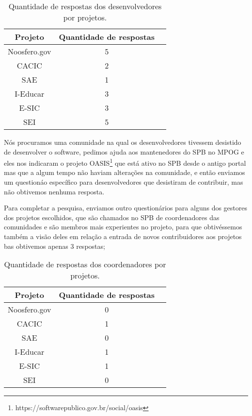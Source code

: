 \begin{table}[h]
	\centering
	\label{tab01}
	
	\begin{tabular}{ccc}
		\toprule
		\textbf{Projeto} & \textbf{Quantidade de respostas} \\
		\midrule
		Noosfero.gov & 5 \\
		CACIC & 2 \\
		SAE & 1 \\
		I-Educar & 3 \\
		E-SIC & 3 \\
		SEI & 5 \\
		\bottomrule
	\end{tabular}

	\caption{Quantidade de respostas dos desenvolvedores por projetos.}
\end{table}
  
Nós procuramos uma comunidade na qual os desenvolvedores tivessem desistido
de desenvolver o software, pedimos ajuda aos mantenedores do SPB no MPOG e eles nos 
indicaram o projeto OASIS\footnote{https://softwarepublico.gov.br/social/oasis} que 
está ativo no SPB desde o antigo portal mas que a algum tempo não haviam alterações
na comunidade, e então enviamos um questionáo específico para desenvolvedores
que desistiram de contribuir, mas não obtivemos nenhuma resposta. 

Para completar a pesquisa, enviamos outro questionários para alguns dos gestores dos
projetos escolhidos, que são chamados no SPB de coordenadores das comunidades e 
são membros mais experientes no projeto, para que obtivéssemos também a visão 
deles em relação a entrada de novos contribuidores aos projetos bas obtivemos 
apenas 3 respostas;

\begin{table}[h]
	\centering
	\label{tab01}
	
	\begin{tabular}{ccc}
		\toprule
		\textbf{Projeto} & \textbf{Quantidade de respostas} \\
		\midrule
		Noosfero.gov & 0 \\
		CACIC & 1 \\
		SAE & 0 \\
		I-Educar & 1 \\
		E-SIC & 1 \\
		SEI & 0 \\
		\bottomrule
	\end{tabular}

	\caption{Quantidade de respostas dos coordenadores por projetos.}
\end{table}

